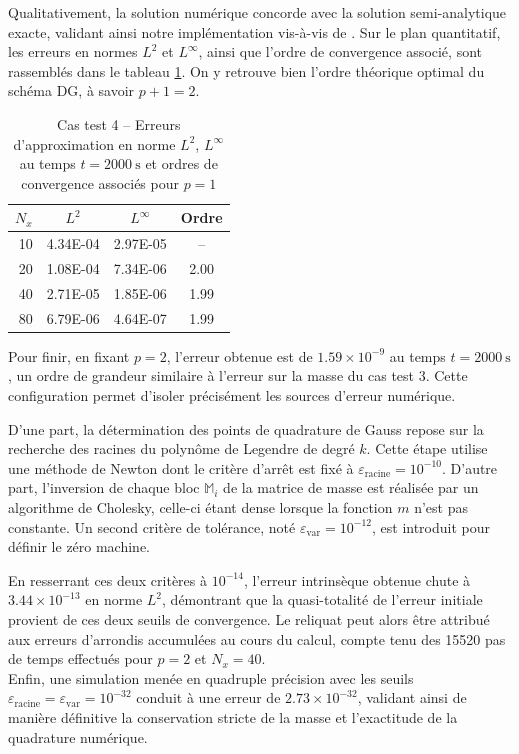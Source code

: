 \documentclass[11pt, a4paper, oneside]{report}
\begin{document}
Qualitativement, la solution numérique concorde avec la solution semi-analytique exacte, validant ainsi notre implémentation vis-à-vis de \cite{fernandez2025third}. Sur le plan quantitatif, les erreurs en normes $L^2$ et $L^\infty$, ainsi que l'ordre de convergence associé, sont rassemblés dans le tableau \ref{tab:convergence_fernandez_nieto}. On y retrouve bien l'ordre théorique optimal du schéma DG, à savoir $p+1 = 2$.

\begin{table}[H]
    \centering
    \small
    \begin{tabular}{r ccc}
    \toprule
    $N_x$ & $L^2$ & $L^\infty$ & Ordre \\
    \midrule
    10 & 4.34E-04 & 2.97E-05 & -- \\
    20 & 1.08E-04 & 7.34E-06 & 2.00 \\
    40 & 2.71E-05 & 1.85E-06 & 1.99 \\
    80 & 6.79E-06 & 4.64E-07 & 1.99 \\
    \bottomrule
    \end{tabular}
    \caption{Cas test 4 -- Erreurs d'approximation en norme $L^2$, $L^\infty$ au temps $t = \SI{2000}{\second}$ et ordres de convergence associés pour $p = 1$}
    \label{tab:convergence_fernandez_nieto}
\end{table}

Pour finir, en fixant $p = 2$, l'erreur obtenue est de $1.59 \times 10^{-9}$ au temps $t = \SI{2000}{\second}$, un ordre de grandeur similaire à l'erreur sur la masse du cas test 3. Cette configuration permet d'isoler précisément les sources d'erreur numérique.

D'une part, la détermination des points de quadrature de Gauss repose sur la recherche des racines du polynôme de Legendre de degré $k$. Cette étape utilise une méthode de Newton dont le critère d'arrêt est fixé à $\varepsilon_\text{racine} = 10^{-10}$. D'autre part, l'inversion de chaque bloc $\mathbb{M}_i$ de la matrice de masse est réalisée par un algorithme de Cholesky, celle-ci étant dense lorsque la fonction $m$ n'est pas constante. Un second critère de tolérance, noté $\varepsilon_\text{var} = 10^{-12}$, est introduit pour définir le zéro machine.

En resserrant ces deux critères à $10^{-14}$, l'erreur intrinsèque obtenue chute à $3.44 \times 10^{-13}$ en norme $L^2$, démontrant que la quasi-totalité de l'erreur initiale provient de ces deux seuils de convergence. Le reliquat peut alors être attribué aux erreurs d'arrondis accumulées au cours du calcul, compte tenu des 15520 pas de temps effectués pour $p = 2$ et $N_x = 40$. \\
Enfin, une simulation menée en quadruple précision avec les seuils $\varepsilon_\text{racine} = \varepsilon_\text{var} = 10^{-32}$ conduit à une erreur de $2.73 \times 10^{-32}$, validant ainsi de manière définitive la conservation stricte de la masse et l'exactitude de la quadrature numérique.
\end{document}

